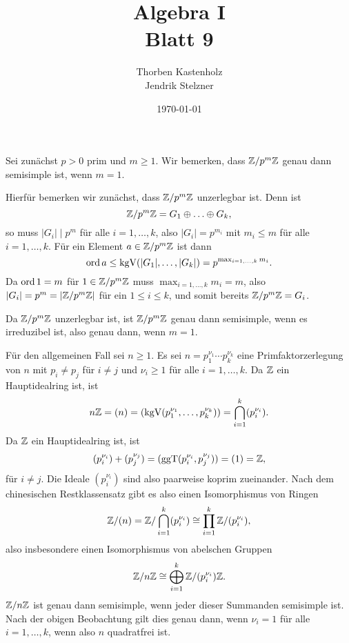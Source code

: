 \documentclass[a4paper,10pt]{article}
\title{\sc Algebra I \\ \Large Blatt 9}
\author{Thorben Kastenholz \\ Jendrik Stelzner}
\date{\today}
\begin{document}
\maketitle



\addtocounter{section}{1}





\section{}
Sei zunächst $p > 0$ prim und $m \geq 1$. Wir bemerken, dass $\mathbb{Z}/p^m\mathbb{Z}$ genau dann semisimple ist, wenn $m = 1$.

Hierfür bemerken wir zunächst, dass $\mathbb{Z}/p^m\mathbb{Z}$ unzerlegbar ist. Denn ist
\[
 \mathbb{Z}/p^m\mathbb{Z} = G_1 \oplus \ldots \oplus G_k,
\]
so muss $|G_i| \mid p^m$ für alle $i = 1, \ldots, k$, also $|G_i| = p^{m_i}$ mit $m_i \leq m$ für alle $i = 1, \ldots, k$. Für ein Element $a \in \mathbb{Z}/p^m\mathbb{Z}$ ist dann
\[
 \operatorname{ord} a \leq \operatorname{kgV}(|G_1|, \ldots, |G_k|) = p^{\max_{i=1,\ldots,k} m_i}.
\]
Da $\operatorname{ord} 1 = m$ für $1 \in \mathbb{Z}/p^m\mathbb{Z}$ muss $\max_{i=1,\ldots,k} m_i = m$, also $|G_i| = p^m = |\mathbb{Z}/p^m\mathbb{Z}|$ für ein $1 \leq i \leq k$, und somit bereits $\mathbb{Z}/p^m\mathbb{Z} = G_i$. 

Da $\mathbb{Z}/p^m\mathbb{Z}$ unzerlegbar ist, ist $\mathbb{Z}/p^m\mathbb{Z}$ genau dann semisimple, wenn es irreduzibel ist, also genau dann, wenn $m = 1$.


Für den allgemeinen Fall sei $n \geq 1$. Es sei $n = p_1^{\nu_1} \cdots p_k^{\nu_k}$ eine Primfaktorzerlegung von $n$ mit $p_i \neq p_j$ für $i \neq j$ und $\nu_i \geq 1$ für alle $i = 1, \ldots, k$. Da $\mathbb{Z}$ ein Hauptidealring ist, ist
\[
 n\mathbb{Z} = (n) = (\operatorname{kgV}(p_1^{\nu_1}, \ldots, p_k^{\nu_k})) = \bigcap_{i=1}^k (p_i^{\nu_i}).
\]
Da $\mathbb{Z}$ ein Hauptidealring ist, ist
\[
 (p_i^{\nu_i}) + (p_j^{\nu_j}) = (\operatorname{ggT}(p_i^{\nu_i},p_j^{\nu_j})) = (1) = \mathbb{Z},
\]
für $i \neq j$. Die Ideale $(p_i^{\nu_i})$ sind also paarweise koprim zueinander. Nach dem chinesischen Restklassensatz gibt es also einen Isomorphismus von Ringen
\[
 \mathbb{Z}/(n) = \mathbb{Z}/\bigcap_{i=1}^k (p_i^{\nu_i}) \cong \prod_{i=1}^k \mathbb{Z}/(p_i^{\nu_i}),
\]
also insbesondere einen Isomorphismus von abelschen Gruppen
\[
 \mathbb{Z}/n\mathbb{Z} \cong \bigoplus_{i=1}^k \mathbb{Z}/(p_i^{\nu_i})\mathbb{Z}.
\]
$\mathbb{Z}/n\mathbb{Z}$ ist genau dann semisimple, wenn jeder dieser Summanden semisimple ist. Nach der obigen Beobachtung gilt dies genau dann, wenn $\nu_i = 1$ für alle $i = 1, \ldots, k$, wenn also $n$ quadratfrei ist.
\end{document}
